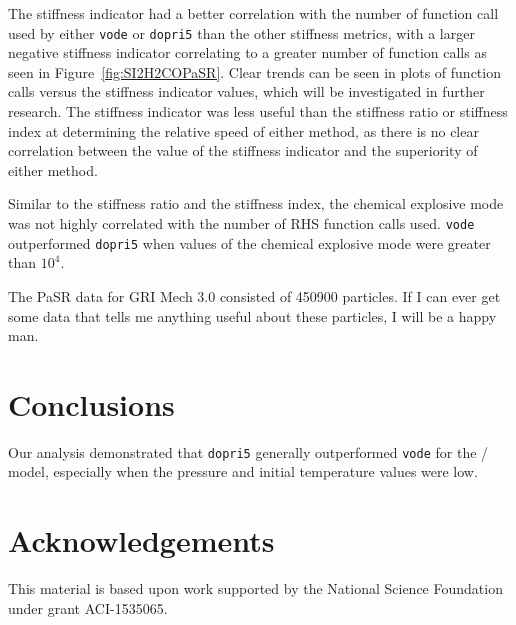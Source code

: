 \documentclass[12pt]{ussci}
\begin{document}
The stiffness indicator had a better correlation with the number of function call used by either \texttt{vode} or \texttt{dopri5} than the other stiffness metrics, with a larger negative stiffness indicator correlating to a greater number of function calls as seen in Figure~\ref{fig:SI2H2COPaSR}.
Clear trends can be seen in plots of function calls versus the stiffness indicator values, which will be investigated in further research.
The stiffness indicator was less useful than the stiffness ratio or stiffness index at determining the relative speed of either method, as there is no clear correlation between the value of the stiffness indicator and the superiority of either method.

Similar to the stiffness ratio and the stiffness index, the chemical explosive mode was not highly correlated with the number of RHS function calls used.  \texttt{vode} outperformed \texttt{dopri5} when values of the chemical explosive mode were greater than $10^4$.

The PaSR data for GRI Mech 3.0 consisted of 450900 particles.  If I can ever get some data that tells me anything useful about these particles, I will be a happy man.

\section{Conclusions}

Our analysis demonstrated that \texttt{dopri5} generally outperformed \texttt{vode} for the \slash {} model, especially when the pressure and initial temperature values were low.
%

\section{Acknowledgements}
This material is based upon work supported by the National Science Foundation under grant ACI-1535065.

\setlength{\emergencystretch}{3em}
\printbibliography
\end{document}
